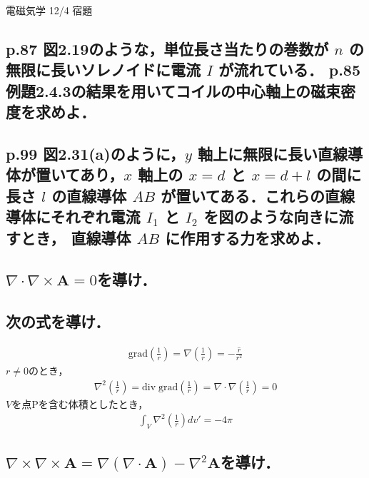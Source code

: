 \documentclass[a4paper, 12pt]{bxjsarticle}
\begin{document}
\begin{center}
    \begin{huge}
        電磁気学 12/4 宿題
    \end{huge}
\end{center}

\subsection{p.87 図2.19のような，単位長さ当たりの巻数が \(n\) の無限に長いソレノイドに電流 \(I\) が流れている．%
p.85 例題2.4.3の結果を用いてコイルの中心軸上の磁束密度を求めよ．}
\vspace{20em}

\subsection{p.99 図2.31(a)のように，\(y\) 軸上に無限に長い直線導体が置いてあり，\(x\) 軸上の \(x=d\) と%
 \(x=d+l\) の間に長さ \(l\) の直線導体 \(AB\) が置いてある．これらの直線導体にそれぞれ電流 \(I_1\) と \(I_2\) を図のような向きに流すとき，%
直線導体 \(AB\) に作用する力を求めよ．}

\newpage
\subsection{\(\nabla\cdot\nabla\times \boldsymbol{A}=0\)を導け．}
\vspace{10em}
\subsection{次の式を導け．}
\vspace*{-2em}
\begin{align}
    \mathrm{grad}\left(\frac{1}{r}\right)=\nabla\left(\frac{1}{r}\right)=-\frac{\hat r}{r^2}
\end{align}
\(r \ne 0\)のとき，
\begin{align}
    \nabla^2\left(\frac{1}{r}\right) = \mathrm{div\;grad}\left(\frac{1}{r}\right) = \nabla\cdot\nabla\left(\frac{1}{r}\right) = 0
\end{align}
\(V\)を点\(\mathrm{P}\)を含む体積としたとき，
\begin{align}
    \int_V \nabla^2 \left(\frac{1}{r}\right) dv'= -4\pi
\end{align}
\newpage
\subsection{\(\nabla\times\nabla\times\boldsymbol{A}=\nabla\left(\nabla\cdot\boldsymbol{A}\right)-\nabla^2\boldsymbol{A}\)を導け．}
\end{document}
